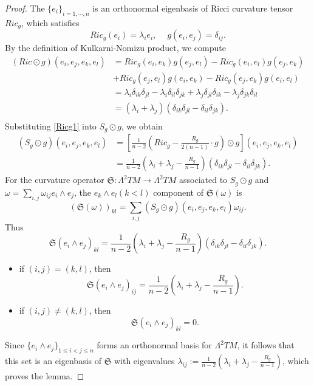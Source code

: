 \documentclass[12pt, twoside]{article}
\theoremstyle{definition}
\numberwithin{equation}{section}
\def \de {\delta}
\def \la {\lambda}
\def \La {\Lambda}
\def\w {\omega}
\begin{document}
	\begin{proof}
		The $\{e_{i}\}_{i=1,\cdots,n}$ is an orthonormal eigenbasis of Ricci curvature tensor $Ric_{g}$, which satisfies
		\begin{equation*}
		Ric_{g}(e_{i})=\la_{i}e_{i},\ \quad g(e_{i},e_{j})=\de_{ij}.
		\end{equation*}
		By the definition of  Kulkarni-Nomizu product, we compute
		\begin{equation}\label{Ricg1}
		\begin{split}
		(Ric\odot g)(e_{i},e_{j},e_{k},e_{l})&=Ric_{g}(e_{i},e_{k})g(e_{j},e_{l})-Ric_{g}(e_{i},e_{l})g(e_{j},e_{k})\\
		&+Ric_{g}(e_{j},e_{l})g(e_{i},e_{k})-Ric_{g}(e_{j},e_{k})g(e_{i},e_{l})\\
		&=\la_{i}\de_{ik}\de_{jl}-\la_{i}\de_{il}\de_{jk}+\la_{j}\de_{jl}\de_{ik}-\la_{j}\de_{jk}\de_{il}\\
		&=(\la_{i}+\la_{j})(\de_{ik}\de_{jl}-\de_{il}\de_{jk}).\\
		\end{split}
		\end{equation}
		Substituting \eqref{Ricg1} into $S_{g}\odot g$, we obtain
		\begin{equation*}
		\begin{split}
		(S_{g}\odot g)(e_{i},e_{j},e_{k},e_{l})&=\left[\frac{1}{n-2}\left(Ric_{g}-\frac{R_{g}}{2(n-1)}\cdot g\right)\odot g\right](e_{i},e_{j},e_{k},e_{l})\\
		&=\frac{1}{n-2}\left(\la_{i}+\la_{j}-\frac{R_{g}}{n-1}\right)(\de_{ik}\de_{jl}-\de_{il}\de_{jk}).
		\end{split}
		\end{equation*}	
		For the curvature operator $\mathfrak{S}:\La^{2}TM\rightarrow\La^{2}TM$ associated to $S_{g} \odot g$ and $\w=\sum_{i,j}\w_{ij}e_i\wedge e_j$,  the $e_{k}\wedge e_{l}(k<l)$ component of $\mathfrak{S}(\w)$  is
		$$ (\mathfrak{S}(\w))_{kl}=\sum_{i,j}(S_{g}\odot g)(e_{i},e_{j},e_{k},e_{l})\w_{ij}.$$
		Thus
		$$\mathfrak{S}(e_{i}\wedge e_{j})_{kl}=\frac{1}{n-2}(\la_{i}+\la_{j}-\frac{R_{g}}{n-1})(\de_{ik}\de_{jl}-\de_{il}\de_{jk}).$$
		\begin{itemize}
			\item if $(i,j)=(k,l)$, then  
			$$\mathfrak{S}(e_{i}\wedge e_{j})_{ij}=\frac{1}{n-2}(\la_{i}+\la_{j}-\frac{R_{g}}{n-1}).$$
			\item if $(i,j)\neq (k,l)$, then
			$$\mathfrak{S}(e_{i}\wedge e_{j})_{kl}=0.$$
		\end{itemize}
		Since  
		$\{e_{i}\wedge e_{j}\}_{1\leq i<j\leq n}$ forms an orthonormal basis for $\La^{2}TM$, it follows that this set is an eigenbasis of $\mathfrak{S}$ with eigenvalues
		$\la_{ij}:=\frac{1}{n-2}(\la_{i}+\la_{j}-\frac{R_{g}}{n-1})$, which proves the lemma.
	\end{proof}
\end{document}
